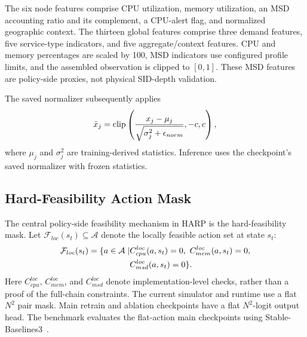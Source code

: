 \documentclass[final,5p]{elsarticle}
\newcommand{\rev}[1]{\textcolor{revisiongreen}{#1}}
\let\newrev\rev
\begin{document}
\rev{The six node features comprise CPU utilization, memory utilization, an MSD accounting ratio and its complement, a CPU-alert flag, and normalized geographic context. The thirteen global features comprise three demand features, five service-type indicators, and five aggregate/context features. CPU and memory percentages are scaled by 100, MSD indicators use configured profile limits, and the assembled observation is clipped to \([0,1]\). These MSD features are policy-side proxies, not physical SID-depth validation.}

\rev{The saved normalizer subsequently applies}
\begin{equation}
\rev{\bar{x}_j=\mathrm{clip}\left(\frac{x_j-\mu_j}{\sqrt{\sigma_j^2+\epsilon_{norm}}},-c,c\right),}
\end{equation}
\rev{where \(\mu_j\) and \(\sigma_j^2\) are training-derived statistics. \rev{Inference uses the checkpoint's saved normalizer with frozen statistics.}}

\subsection{Hard-Feasibility Action Mask}
\label{subsec:harp_masking}

The central \rev{policy-side feasibility mechanism} in HARP is the hard-feasibility mask. Let \(\mathcal{F}_{loc}(s_t)\subseteq\mathcal{A}\) denote the \rev{locally feasible} action set at state \(s_t\):
\begin{equation}
\rev{\begin{aligned}
\mathcal{F}_{loc}(s_t)=\{a\in\mathcal A\mid
&C_{cpu}^{loc}(a,s_t)=0,\ C_{mem}^{loc}(a,s_t)=0,\\
&C_{msd}^{loc}(a,s_t)=0\}.
\end{aligned}}
\label{eq:feasible_set}
\end{equation}
Here \(C_{cpu}^{loc}\), \(C_{mem}^{loc}\), and \(C_{msd}^{loc}\) denote implementation-level checks, rather than a proof of the full-chain constraints. The current simulator and runtime use a flat \(N^2\) pair mask. Main retrain and ablation checkpoints have a flat \(N^2\)-logit output head. \newrev{The benchmark evaluates the flat-action main checkpoints using Stable-Baselines3~\cite{raffin2021sb3}.}
\end{document}
